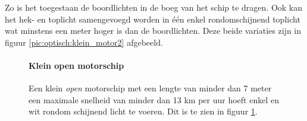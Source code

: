 \vspace{-0.6cm}
Zo is het toegestaan de boordlichten in de boeg van het schip te dragen. Ook kan het hek- en toplicht samengevoegd worden in één enkel rondomschijnend toplicht wat minstens een meter hoger is dan de boordlichten. Deze beide variaties zijn in figuur \ref{pic:optisch:klein_motor2} afgebeeld.


\begin{figure}[H]
	\centering
	\begin{minipage}[t]{0.75\textwidth}
		\paragraph{Klein open motorschip}
		Een klein \textit{open} motorschip met een lengte van minder dan 7 meter een maximale snelheid van minder dan 13 km per uur hoeft enkel en wit rondom schijnend licht te voeren. Dit is te zien in figuur \ref{pic:optisch:klein_openmotor}.
	\end{minipage}
	\hfill
	\begin{minipage}[t]{0.22\textwidth}
		\RemoveLine
		\caption{}
		\label{pic:optisch:klein_openmotor}
	\end{minipage}
\end{figure}


